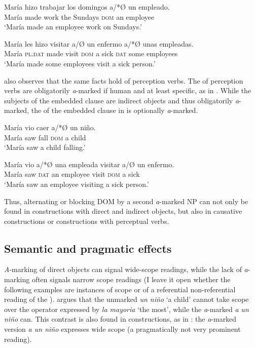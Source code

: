 \documentclass[output=paper]{LSP/langsci}
\begin{document}
\ea%
\label{11-he-ex:37}
\gll María hizo trabajar los domingos a/*Ø un empleado.\\
María made work the Sundays \textsc{dom} an employee\\
\glt ‘María made an employee work on Sundays.’
\z

\ea%
\label{11-he-ex:38}
\gll María les hizo visitar a/Ø un enfermo a/*Ø unas empleadas.\\
María \textsc{pl}.\textsc{dat} made visit \textsc{dom} a sick \textsc{dat} some employees\\
\glt ‘María made some employees visit a sick person.’
\z

\citeauthor{Lopez2012Indefinite} also observes that the same facts hold of perception verbs. The  of perception verbs are obligatorily \textit{a}-marked if human and at least specific, as in . While the subjects of the embedded clause are indirect objects and thus obligatorily \textit{a}-marked, the  of the embedded clause in  is optionally \textit{a}-marked.

\ea%
\label{11-he-ex:39}
\gll María vio caer a/*Ø un niño.\\
María saw fall \textsc{dom} a child\\
\glt ‘María saw a child falling.’
\z

\ea%
\label{11-he-ex:40}
\gll María vio a/*Ø una empleada visitar a/Ø un enfermo.\\
María saw \textsc{dat} an employee visit \textsc{dom} a sick\\
\glt ‘María saw an employee visiting a sick person.’
\z

Thus, alternating or blocking DOM by a second \textit{a}-marked NP can not only be found in  constructions with direct and indirect objects, but also in causative constructions or constructions with perceptual verbs.

\subsection{Semantic and pragmatic effects}
\label{11-subsec:3-3}

\textit{A}{}-marking of  direct objects can signal wide-scope readings, while the lack of \textit{a}-marking often signals narrow scope readings (I leave it open whether the following examples are instances of scope or of a referential \vs non-referential reading of the ). \citet[77]{Lopez2012Indefinite} argues that the unmarked  \textit{un niño} ‘a child’ cannot take scope over the operator expressed by \textit{la mayoria} ‘the most’, while the \textit{a}-marked \textit{a} \textit{un niño} can. This contrast is also found in  constructions, as in : the \textit{a}-marked version \textit{a un niño} expresses wide scope (a pragmatically not very prominent reading). 
\end{document}
